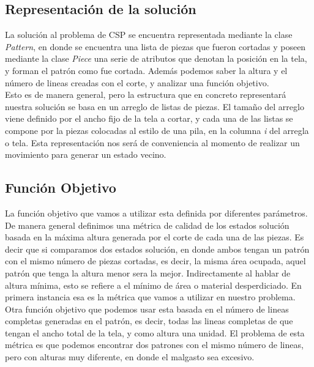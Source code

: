 \documentclass[letterpaper,11pt]{article}
\begin{document}
\subsection{Representaci\'on de la soluci\'on}

La soluci\'on al problema de CSP se encuentra representada mediante la clase \emph{Pattern}, en donde se encuentra 
una lista de piezas que fueron cortadas y poseen mediante la clase \emph{Piece} una serie de atributos que denotan
la posici\'on en la tela, y forman el patr\'on como fue cortada. Adem\'as podemos saber la altura y el n\'umero de lineas 
creadas con el corte, y analizar una funci\'on objetivo.\\

Esto es de manera general, pero la estructura que en concreto representar\'a nuestra soluci\'on se basa en un arreglo de
listas de piezas. El tamaño del arreglo viene definido por el ancho fijo de la tela a cortar, y cada una de las listas
se compone por la piezas colocadas al estilo de una pila, en la columna \emph{i} del arregla o tela. Esta representaci\'on
nos ser\'a de conveniencia al momento de realizar un movimiento para generar un estado vecino.

\subsection{Funci\'on Objetivo}

La funci\'on objetivo que vamos a utilizar esta definida por diferentes par\'ametros. De manera general definimos
una m\'etrica de calidad de los estados soluci\'on basada en la m\'axima altura generada por el corte de cada una de las piezas.
Es decir que si comparamos dos estados soluci\'on, en donde ambos tengan un patr\'on con el mismo n\'umero de piezas cortadas, 
es decir, la misma \'area ocupada, aquel patr\'on que tenga la altura menor sera la mejor. 
Indirectamente al hablar de altura m\'inima, esto se refiere a el m\'inimo de \'area o material desperdiciado.
En primera instancia esa es la m\'etrica que vamos a utilizar en nuestro problema.\\

Otra funci\'on objetivo que podemos usar esta basada en el n\'umero de lineas completas generadas en el patr\'on, es decir,
todas las lineas completas de que tengan el ancho total de la tela, y como altura una unidad. El problema de esta m\'etrica es que podemos encontrar dos patrones con el mismo n\'umero de lineas, pero con alturas muy diferente, en donde el malgasto sea excesivo.\\
\end{document}
